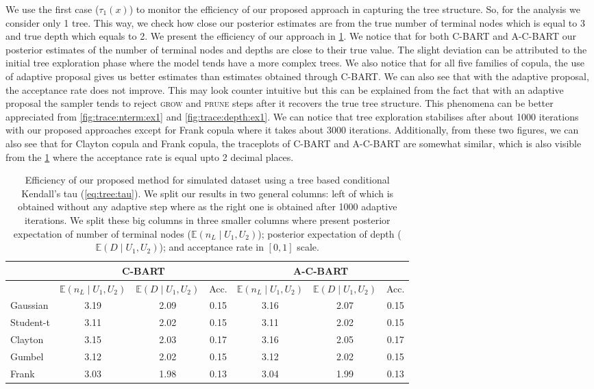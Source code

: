 \documentclass{amsart}
\begin{document}
We use the first case ($\tau_1(x)$) to monitor the efficiency of our proposed approach in capturing the tree structure. So, for the analysis we consider only 1 tree. This way, we check how close our posterior estimates are from the true number of terminal nodes which is equal to 3 and true depth which equals to 2. We present the efficiency of our approach in \cref{tab:eff:ex1}. We notice that for both C-BART and A-C-BART our posterior estimates of the number of terminal nodes and depths are close to their true value. The slight deviation can be attributed to the initial tree exploration phase where the model tends have a more complex trees. We also notice that for all five families of copula, the use of adaptive proposal gives us better estimates than estimates obtained through C-BART. We can also see that with the adaptive proposal, the acceptance rate does not improve. This may look counter intuitive but this can be explained from the fact that with an adaptive proposal the sampler tends to reject \textsc{grow} and \textsc{prune} steps after it recovers the true tree structure. This phenomena can be better appreciated from \cref{fig:trace:nterm:ex1} and \cref{fig:trace:depth:ex1}. We can notice that tree exploration stabilises after about 1000 iterations with our proposed approaches except for Frank copula where it takes about 3000 iterations. Additionally, from these two figures, we can also see that for Clayton copula and Frank copula, the traceplots of C-BART and A-C-BART are somewhat similar, which is also visible from the \cref{tab:eff:ex1} where the acceptance rate is equal upto 2 decimal places. 

\begin{table}[ht]
	\centering
	\begin{tabular}{l|ccc|ccc}
		\multicolumn{1}{c|}{} &
		\multicolumn{3}{c|}{C-BART} &
		\multicolumn{3}{c}{A-C-BART} \\
		\midrule
		& $\mathbb{E}(n_L\mid U_1,U_2)$ & $\mathbb{E}(D\mid U_1,U_2)$ & Acc. & $\mathbb{E}(n_L\mid U_1,U_2)$ & $\mathbb{E}(D\mid U_1,U_2)$ & Acc. \\ 
		\midrule
		Gaussian & 3.19 & 2.09 & 0.15 & 3.16 & 2.07 & 0.15 \\ 
		Student-t & 3.11 & 2.02 & 0.15 & 3.11 & 2.02 & 0.15 \\ 
		Clayton & 3.15 & 2.03 & 0.17 & 3.16 & 2.05 & 0.17 \\ 
		Gumbel & 3.12 & 2.02 & 0.15 & 3.12 & 2.02 & 0.15 \\ 
		Frank & 3.03 & 1.98 & 0.13 & 3.04 & 1.99 & 0.13 \\ 
	\end{tabular}
	\caption{Efficiency of our proposed method for simulated dataset using a tree based conditional Kendall's tau (\cref{eq:tree:tau}). We split our results in two general columns: left of which is obtained without any adaptive step where as the right one is obtained after 1000 adaptive iterations. We split these big columns in three smaller columns where present posterior expectation of number of terminal nodes ($\mathbb{E}(n_L\mid U_1,U_2)$); posterior expectation of depth ($\mathbb{E}(D\mid U_1,U_2)$); and acceptance rate in $[0,1]$ scale.}
	\label{tab:eff:ex1}
\end{table}
\end{document}
